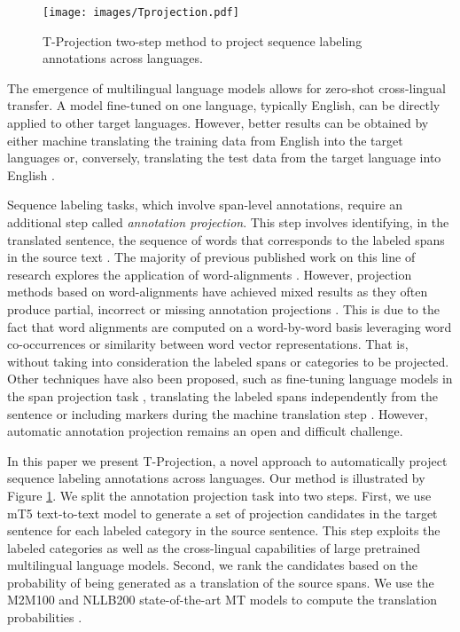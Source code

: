 \documentclass[11pt]{article}
\begin{document}
\begin{figure}[t]
\centering
\texttt{[image: images/Tprojection.pdf]}
\caption{T-Projection two-step method to project sequence
labeling annotations across languages.}
\label{fig:Tprojection}
\end{figure} 

The emergence of multilingual language models \cite{DBLP:conf/naacl/DevlinCLT19,xlmr} allows for zero-shot cross-lingual transfer. A model fine-tuned on one language, typically English, can be directly applied to other target languages. However, better results can be obtained by either machine translating the training data from English into the target languages or, conversely, translating the test data from the target language into English \cite{DBLP:conf/icml/HuRSNFJ20,DBLP:journals/corr/abs-2305-14240}. 

Sequence labeling tasks, which involve span-level annotations, require an additional step called \textit{annotation projection}. This step involves identifying, in the translated sentence, the sequence of words that corresponds to the labeled spans in the source text \cite{DBLP:conf/naacl/YarowskyNW01,Ehrmann}. The majority of previous published work on this line of research explores the application of word-alignments \cite{Ehrmann}. However, projection methods based on word-alignments have achieved mixed results as they often produce partial, incorrect or missing annotation projections \cite{garcia-ferrero-etal-2022-model}. This is due to the fact that word alignments are computed on a word-by-word basis leveraging word co-occurrences or similarity between word vector representations. That is, without taking into consideration the labeled spans or categories to be projected. Other techniques have also been proposed, such as fine-tuning language models in the span projection task
\cite{Li2021crosslingualNE}, translating the labeled spans independently from
the sentence \cite{DBLP:journals/corr/abs-2211-09394} or including markers during the machine translation step \cite{DBLP:journals/corr/abs-2211-15613}. However, automatic annotation
projection remains an open and difficult challenge.







In this paper we present T-Projection, a novel approach to automatically
project sequence labeling annotations across languages. Our method is
illustrated by Figure \ref{fig:Tprojection}. We split the annotation projection
task into two steps. First, we use mT5
\cite{DBLP:conf/naacl/XueCRKASBR21} text-to-text model to generate a set of
projection candidates in the target sentence for each labeled category in the
source sentence. This step exploits the labeled categories as well as the
cross-lingual capabilities of large pretrained multilingual language models.
Second, we rank the candidates based on the probability of being generated as
a translation of the source spans. We use the M2M100
\cite{DBLP:journals/jmlr/FanBSMEGBCWCGBL21} and NLLB200 \cite{DBLP:journals/corr/abs-2207-04672} state-of-the-art MT models to compute the translation probabilities
\cite{DBLP:journals/corr/abs-2204-13692}.
\end{document}
